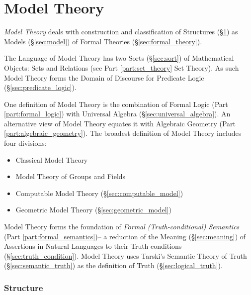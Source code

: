 \part{Model Theory}\label{part:model_theory}\cite{hodges97}

\emph{Model Theory} deals with construction and classification of
Structures (\S\ref{sec:structure}) as Models (\S\ref{sec:model}) of
Formal Theories (\S\ref{sec:formal_theory}).

The Language of Model Theory has two Sorts (\S\ref{sec:sort}) of
Mathematical Objects: Sets and Relations (see Part
\ref{part:set_theory} Set Theory). As such Model Theory forms the
Domain of Discourse for Predicate Logic (\S\ref{sec:predicate_logic}).

One definition of Model Theory is the combination of Formal Logic
(Part \ref{part:formal_logic}) with Universal Algebra
(\S\ref{sec:universal_algebra}). An alternative view of Model Theory
equates it with Algebraic Geometry (Part
\ref{part:algebraic_geometry}). The broadest definition of Model
Theory includes four divisions:
\begin{itemize}
  \item Classical Model Theory
  \item Model Theory of Groups and Fields
  \item Computable Model Theory (\S\ref{sec:computable_model})
  \item Geometric Model Theory (\S\ref{sec:geometric_model})
\end{itemize}

Model Theory forms the foundation of \emph{Formal (Truth-conditional)
  Semantics} (Part \ref{part:formal_semantics})-- a reduction of the
Meaning (\S\ref{sec:meaning}) of Assertions in Natural Languages to
their Truth-conditions (\S\ref{sec:truth_condition}). Model Theory
uses Tarski's Semantic Theory of Truth (\S\ref{sec:semantic_truth}) as
the definition of Truth (\S\ref{sec:logical_truth}).



\section{Structure}\label{sec:structure}


